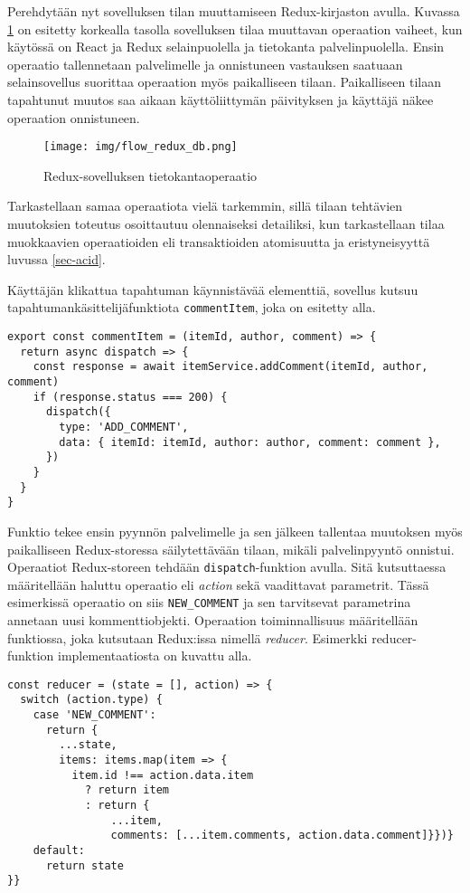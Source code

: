 \documentclass[finnish,twoside,censored,csm,sw-track-2018]{HYthesisML}
\begin{document}
Perehdytään nyt sovelluksen tilan muuttamiseen Redux-kirjaston avulla. Kuvassa \ref{fig-redux-seq-1} on esitetty korkealla tasolla sovelluksen tilaa muuttavan operaation vaiheet, kun käytössä on React ja Redux selainpuolella ja tietokanta palvelinpuolella. Ensin operaatio tallennetaan palvelimelle ja onnistuneen vastauksen saatuaan selainsovellus suorittaa operaation myös paikalliseen tilaan. Paikalliseen tilaan tapahtunut muutos saa aikaan käyttöliittymän päivityksen ja käyttäjä näkee operaation onnistuneen.

\begin{figure}[ht]
  \centering
    \texttt{[image: img/flow\_redux\_db.png]}
  \caption{Redux-sovelluksen tietokantaoperaatio}
  \label{fig-redux-seq-1}
\end{figure}

Tarkastellaan samaa operaatiota vielä tarkemmin, sillä tilaan tehtävien muutoksien toteutus osoittautuu olennaiseksi detailiksi, kun tarkastellaan tilaa muokkaavien operaatioiden eli transaktioiden atomisuutta ja eristyneisyyttä luvussa \ref{sec-acid}.

Käyttäjän klikattua tapahtuman käynnistävää elementtiä, sovellus kutsuu tapahtumankä\-sittelijäfunktiota \verb+commentItem+, joka on esitetty alla.

\begin{Verbatim}[fontsize=\footnotesize]
export const commentItem = (itemId, author, comment) => {
  return async dispatch => {
    const response = await itemService.addComment(itemId, author, comment)
    if (response.status === 200) {
      dispatch({
        type: 'ADD_COMMENT',
        data: { itemId: itemId, author: author, comment: comment },
      })
    }
  }
}
\end{Verbatim}

Funktio tekee ensin pyynnön palvelimelle ja sen jälkeen tallentaa muutoksen myös paikalliseen Redux-storessa säilytettävään tilaan, mikäli palvelinpyyntö onnistui. Operaatiot Redux-storeen tehdään \verb+dispatch+-funktion avulla. Sitä kutsuttaessa määritellään haluttu operaatio eli \textit{action} sekä vaadittavat parametrit. Tässä esimerkissä operaatio on siis \verb+NEW_COMMENT+ ja sen tarvitsevat parametrina annetaan uusi kommenttiobjekti. Operaation toiminnallisuus määritellään funktiossa, joka kutsutaan Redux:issa nimellä \textit{reducer}. Esimerkki reducer-funktion implementaatiosta on kuvattu alla.

\begin{Verbatim}[fontsize=\footnotesize]
const reducer = (state = [], action) => {
  switch (action.type) {
    case 'NEW_COMMENT':
      return {
        ...state,
        items: items.map(item => {
          item.id !== action.data.item
            ? return item
            : return {
                ...item,
                comments: [...item.comments, action.data.comment]}})}
    default:
      return state
}}
\end{Verbatim}
\end{document}

